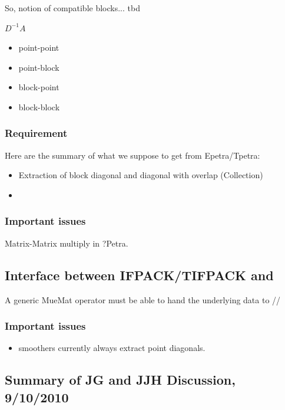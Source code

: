 So, notion of compatible blocks... tbd


$D^{-1} A$
\begin{itemize}
\item point-point
\item point-block
\item block-point
\item block-block
\end{itemize}


\subsubsection{Requirement}

Here are the summary of what we suppose to get from Epetra/Tpetra:

\begin{itemize}
\item Extraction of block diagonal and diagonal with overlap (Collection)
\item 
\end{itemize}

\subsubsection{Important issues}

Matrix-Matrix multiply in ?Petra.

\subsection{Interface between IFPACK/TIFPACK and \mulu}

A generic MueMat operator must be able to hand the underlying data to \Tifpack/\Ifpack/\AztecOO

\subsubsection{Important issues}
\begin{itemize}
\item \Tifpack smoothers currently always extract point diagonals.
\end{itemize}

\subsection{Summary of JG and JJH Discussion, 9/10/2010}

